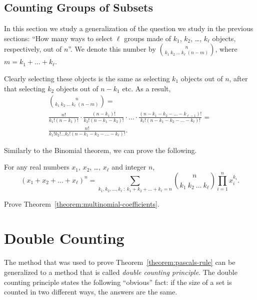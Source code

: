 \subsection{Counting Groups of Subsets}
In this section we study a generalization of the question we study in the
previous sections: ``How many ways to select $\ell$ groups made of $k_1$, $k_2$,
\dots, $k_\ell$ objects, respectively, out of $n$''. We denote this number by
$\binom{n}{k_1 \ k_2 \ \dots \ k_\ell \  (n - m)}$, where
$m = k_1 + \dots + k_\ell$.

Clearly selecting these objects is the same as selecting $k_1$ objects out of
$n$, after that selecting $k_2$ objects out of $n - k_1$ etc. As a result,
\begin{multline*}
  \binom{n}{k_1 \ k_2 \ \dots \ k_\ell \ (n - m)} = \\
  \frac{n!}{k_1! (n - k_1)!} \cdot \frac{(n - k_1)!}{k_2! (n - k_1 - k_2)!}
  \cdot \ldots \cdot
  \frac{
    (n - k_1 - k_2 - \dots - k_{\ell - 1})!
  }{
    k_\ell! (n - k_1 - k_2 - \dots - k_\ell)!
  } = \\
  \frac{n!}{k_1! k_2! \dots k_\ell! (n - k_1 - k_2 - \dots - k_\ell)!}.
\end{multline*}

Similarly to the Binomial theorem, we can prove the following.
\begin{theorem}
\label{theorem:multinomial-coefficients}
  For any real numbers $x_1$, $x_2$, \dots, $x_\ell$ and integer $n$,
  \[
    (x_1 + x_2 + \dots + x_\ell)^n =
    \sum_{k_1, k_2, \dots, k_\ell ~:~ k_1 + k_2 + \dots + k_\ell = n}
      \binom{n}{k_1 \ k_2 \ \dots \ k_\ell} \prod_{i = 1}^n x_i^{k_i}.
  \]
\end{theorem}

\begin{exercise}
  Prove Theorem~\ref{theorem:multinomial-coefficients}.
\end{exercise}

\section{Double Counting}
The method that was used to prove Theorem~\ref{theorem:pascals-rule} can be
generalized to a method that is called \emph{double counting principle}.
The double counting principle states the following “obvious” fact: if the
size of a set is counted in two different ways, the answers are the same.

